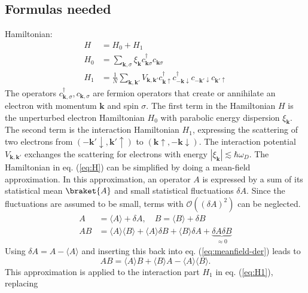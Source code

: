 \subsection*{Formulas needed}
Hamiltonian:
\begin{align}
H &= H_0 + H_1 \label{eq:H}\\
H_0 &= \sum_{\mathbf{k}, \sigma} \xi_{\mathbf{k}} c^{\dagger}_{\mathbf{k} \sigma }c_{\mathbf{k} \sigma }  \label{eq:H0}\\
H_1 &= \frac{1}{N} \sum_{\mathbf{k}, \mathbf{k'}} V_\mathbf{{\mathbf{k}, \mathbf{k'}}} c^{\dagger}_{\mathbf{k} \uparrow }c^{\dagger}_{- \mathbf{k} \downarrow}   c_{- \mathbf{k'} \downarrow} c_{\mathbf{k'} \uparrow} \label{eq:H1}
\end{align}
The operators $c^\dagger_{\mathbf{k}, \sigma} , c_{\mathbf{k}, \sigma}$ are fermion operators that create or annihilate an electron with momentum $\mathbf{k}$ and spin $\sigma$. The first term in the Hamiltonian $H$ is the unperturbed electron Hamiltonian $H_0$ with parabolic energy dispersion $\xi_{\mathbf{k}}$. The  second term is the interaction Hamiltonian $H_1$, expressing the scattering of two electrons from $(- \mathbf{k'} \downarrow,  \mathbf{k'} \uparrow)$ to $(\mathbf{k} \uparrow , - \mathbf{k} \downarrow)$. The interaction potential $V_\mathbf{{\mathbf{k}, \mathbf{k'}}}$ exchanges the scattering for electrons with energy $|\xi_\mathbf{k}| \lesssim \hbar \omega_D$.
The Hamiltonian in eq. (\ref{eq:H}) can be simplified by doing a mean-field approximation. In this approximation, an operator $A$ is expressed by a sum of its statistical mean $\braket{A}$ and small statistical fluctuations $\delta A$. Since the fluctuations are assumed to be small, terms with $\mathcal{O}((\delta A)^2)$ can be neglected.
\begin{align}
A &= \langle A \rangle + \delta A, \quad B = \langle B \rangle + \delta B  \nonumber \\
A B &= \langle A \rangle  \langle B \rangle  + \langle A \rangle  \delta B +  \langle B \rangle \delta A + \underbrace{\delta A \delta B}_{\approx 0}\label{eq:meanfield-der}
\end{align}
Using $\delta A = A - \langle A \rangle$ and inserting this back into eq. (\ref{eq:meanfield-der}) leads to
\begin{equation}
AB = \langle A \rangle B + \langle B \rangle A - \langle A \rangle \langle B \rangle.\label{eq:meanfield-ab}
\end{equation}
This approximation is applied to the interaction part $H_1$ in eq. (\ref{eq:H1}), replacing
